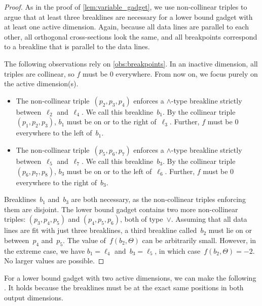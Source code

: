 \begin{proof}
    As in the proof of \cref{lem:variable_gadget}, we use non-collinear triples to argue that at least three breaklines are necessary for a lower bound gadget with at least one active dimension.
    Again, because all data lines are parallel to each other, all orthogonal cross-sections look the same, and all breakpoints correspond to a breakline that is parallel to the data lines.

    The following observations rely on \cref{obs:breakpoints}.
    In an inactive dimension, all triples are collinear, so $f$ must be 
%
$0$ everywhere. 
    From now on, we focus purely on the active dimension(s).
    \begin{itemize}
        \item The non-collinear triple~$(p_2, p_3, p_4)$ enforces a $\wedge$-type breakline strictly between~$\ell_2$ and~$\ell_4$.
        We call this breakline~$b_1$.
        By the collinear triple~$(p_1, p_2, p_3)$, $b_1$ must be on or to the right of~$\ell_3$.
        Further, $f$ must be %
        $0$ everywhere  %
to the left of~$b_1$.

        \item The non-collinear triple~$(p_5, p_6, p_7)$ enforces a $\wedge$-type breakline strictly between~$\ell_5$ and~$\ell_7$.
     We call this breakline~$b_3$.
     By the collinear triple~$(p_6, p_7, p_8)$, $b_3$ must be on or to the left of~$\ell_6$.
     Further, $f$ must be %
$0$ everywhere %
to the right of~$b_3$.
    \end{itemize}
    Breaklines~$b_1$ and~$b_3$ are both necessary, as the non-collinear triples enforcing them are disjoint.
    The lower bound gadget contains two more non-collinear triples:
    $(p_3, p_4, p_5)$ and $(p_4, p_5, p_6)$, both of type~$\vee$.
    Assuming that all data lines are fit with just three breaklines, a third breakline called~$b_2$ must lie on or between~$p_4$ and~$p_5$.
    The value of~$f(b_2, \Theta)$ can be arbitrarily small.
    However, in the extreme case, %
    we have  %
    $b_1 = \ell_4$ and~$b_3 = \ell_5$, in which case~$f(b_2, \Theta) = -2$.
    No larger values are possible.
\end{proof}

For a lower bound gadget with two active dimensions, we can make the following .
It holds because the breaklines must be at the exact same positions in both output dimensions.



